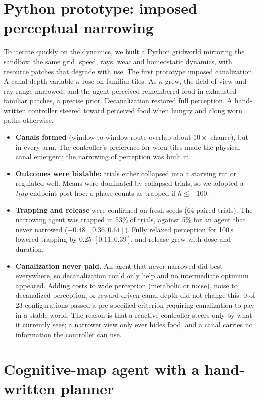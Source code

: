 \documentclass[11pt]{article}
\begin{document}
\section{Python prototype: imposed perceptual narrowing}

To iterate quickly on the dynamics, we built a Python gridworld mirroring the sandbox: the same grid, speed, rays, wear and homeostatic dynamics, with resource patches that degrade with use. The first prototype imposed canalization. A canal-depth variable $\kappa$ rose on familiar tiles. As $\kappa$ grew, the field of view and ray range narrowed, and the agent perceived remembered food in exhausted familiar patches, a precise prior. Decanalization restored full perception. A hand-written controller steered toward perceived food when hungry and along worn paths otherwise.

\begin{itemize}
  \item \textbf{Canals formed} (window-to-window route overlap about $10\times$ chance), but in every arm. The controller's preference for worn tiles made the physical canal emergent; the narrowing of perception was built in.
  \item \textbf{Outcomes were bistable:} trials either collapsed into a starving rut or regulated well. Means were dominated by collapsed trials, so we adopted a \emph{trap} endpoint post hoc: a phase counts as trapped if $h\le-100$.
  \item \textbf{Trapping and release} were confirmed on fresh seeds (64 paired trials). The narrowing agent was trapped in 53\% of trials, against 5\% for an agent that never narrowed ($+0.48$ $[0.36, 0.61]$). Fully relaxed perception for 100\,s lowered trapping by 0.25 $[0.11, 0.39]$, and release grew with dose and duration.
  \item \textbf{Canalization never paid.} An agent that never narrowed did best everywhere, so decanalization could only help and no intermediate optimum appeared. Adding costs to wide perception (metabolic or noise), noise to decanalized perception, or reward-driven canal depth did not change this: 0 of 23 configurations passed a pre-specified criterion requiring canalization to pay in a stable world. The reason is that a reactive controller steers only by what it currently sees; a narrower view only ever hides food, and a canal carries no information the controller can use.
\end{itemize}

\section{Cognitive-map agent with a hand-written planner}
\end{document}
